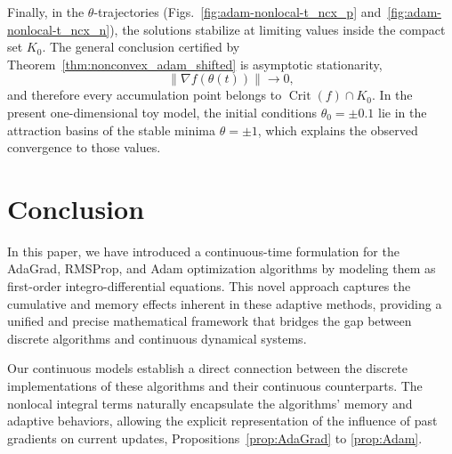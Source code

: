 \documentclass{article} %
\begin{document}
Finally, in the $\theta$-trajectories (Figs.~\ref{fig:adam-nonlocal-t_ncx_p} and~\ref{fig:adam-nonlocal-t_ncx_n}), the solutions stabilize at limiting values inside the compact set $K_0$. The general conclusion certified by Theorem~\ref{thm:nonconvex_adam_shifted} is asymptotic stationarity,
\[
    \|\nabla f(\theta(t))\|\to0,
\]
and therefore every accumulation point belongs to $\operatorname{Crit}(f)\cap K_0$. In the present one-dimensional toy model, the initial conditions $\theta_0=\pm0.1$ lie in the attraction basins of the stable minima $\theta=\pm1$, which explains the observed convergence to those values.

\section{Conclusion}

In this paper, we have introduced a continuous-time formulation for the AdaGrad, RMSProp, and Adam optimization algorithms by modeling them as first-order integro-differential equations. This novel approach captures the cumulative and memory effects inherent in these adaptive methods, providing a unified and precise mathematical framework that bridges the gap between discrete algorithms and continuous dynamical systems.

Our continuous models establish a direct connection between the discrete implementations of these algorithms and their continuous counterparts. The nonlocal integral terms naturally encapsulate the algorithms’ memory and adaptive behaviors, allowing the explicit representation of the influence of past gradients on current updates, Propositions~\ref{prop:AdaGrad} to \ref{prop:Adam}. 
\end{document}
